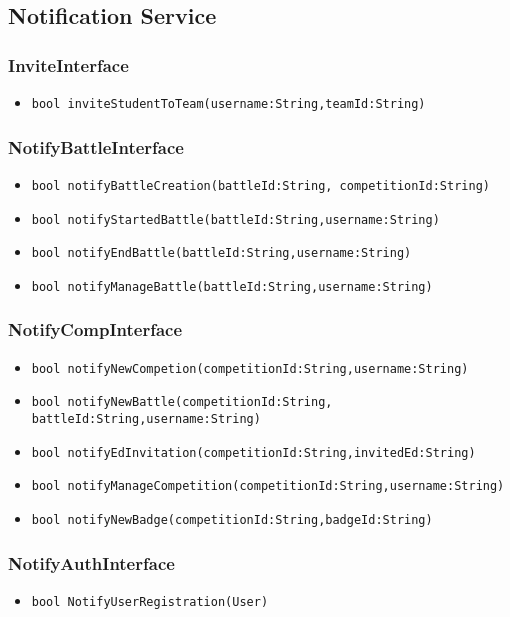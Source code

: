 \subsection{Notification Service}
\subsubsection{InviteInterface}
\begin{itemize}
    \item \texttt{bool inviteStudentToTeam(username:String,teamId:String)}
\end{itemize}

\subsubsection{NotifyBattleInterface}
\begin{itemize}
    \item \texttt{bool notifyBattleCreation(battleId:String, competitionId:String)}
    \item \texttt{bool notifyStartedBattle(battleId:String,username:String)}
    \item \texttt{bool notifyEndBattle(battleId:String,username:String)}
    \item \texttt{bool notifyManageBattle(battleId:String,username:String)}
\end{itemize}

\subsubsection{NotifyCompInterface}
\begin{itemize}
    \item \texttt{bool notifyNewCompetion(competitionId:String,username:String)}
    \item \texttt{bool notifyNewBattle(competitionId:String, battleId:String,username:String)}
    \item \texttt{bool notifyEdInvitation(competitionId:String,invitedEd:String)}
    \item \texttt{bool notifyManageCompetition(competitionId:String,username:String)}
    \item \texttt{bool notifyNewBadge(competitionId:String,badgeId:String)}
\end{itemize}

\subsubsection{NotifyAuthInterface}
\begin{itemize}
    \item \texttt{bool NotifyUserRegistration(User)}
\end{itemize}

